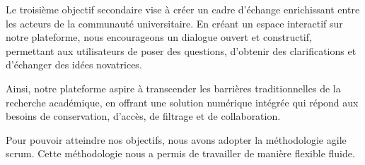 Le troisième objectif secondaire vise à créer un cadre d'échange enrichissant entre les acteurs de la communauté universitaire. En créant un espace interactif sur notre plateforme, nous encourageons un dialogue ouvert et constructif, permettant aux utilisateurs de poser des questions, d'obtenir des clarifications et d'échanger des idées novatrices.\par

Ainsi, notre plateforme aspire à transcender les barrières traditionnelles de la recherche académique, en offrant une solution numérique intégrée qui répond aux besoins de conservation, d'accès, de filtrage et de collaboration.
\par

Pour pouvoir atteindre nos objectifs, nous avons adopter la méthodologie agile scrum. Cette méthodologie nous a permis de travailler de manière flexible fluide.
